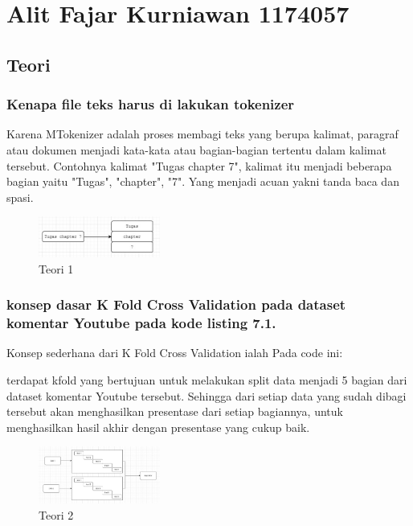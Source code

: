 \section{Alit Fajar Kurniawan 1174057}
\subsection{Teori}
\subsubsection{Kenapa file teks harus di lakukan tokenizer}
\hfill\break
Karena MTokenizer adalah proses membagi teks yang berupa kalimat, paragraf atau dokumen menjadi kata-kata atau bagian-bagian tertentu dalam kalimat tersebut. Contohnya kalimat "Tugas chapter 7", kalimat itu menjadi beberapa bagian yaitu "Tugas", "chapter", "7". Yang menjadi acuan yakni tanda baca dan spasi.
\begin{figure}[H]
\centering
	\includegraphics[width=4cm]{figures/1174057/chapter7/1.jpg}
\caption{Teori 1}
\end{figure}

\subsubsection{konsep dasar K Fold Cross Validation pada dataset komentar Youtube pada kode listing 7.1.}
\hfill\break
Konsep sederhana dari K Fold Cross Validation ialah Pada code ini:

terdapat kfold yang bertujuan untuk melakukan split data menjadi 5 bagian dari dataset komentar Youtube tersebut. Sehingga dari setiap data yang sudah dibagi tersebut akan menghasilkan presentase dari setiap bagiannya, untuk menghasilkan hasil akhir dengan presentase yang cukup baik.
\begin{figure}[H]
\centering
	\includegraphics[width=4cm]{figures/1174057/chapter7/2.jpg}
\caption{Teori 2}
\end{figure}

